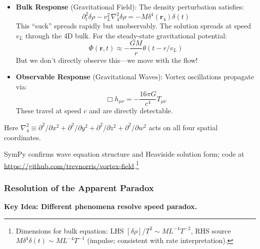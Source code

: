 \begin{itemize}
\item \textbf{Bulk Response} (Gravitational Field): The density perturbation satisfies:
\begin{equation}
\partial_t^2 \delta\rho - v_L^2 \nabla_4^2 \delta\rho = -M\delta^4(\mathbf{r}_4)\delta(t)
\end{equation}
This ``suck'' spreads rapidly but unobservably. The solution spreads at speed $v_L$ through the 4D bulk. For the steady-state gravitational potential:
\begin{equation}
\Phi(\mathbf{r},t) \approx -\frac{GM}{r} \theta(t - r/v_L)
\end{equation}
But we don't directly observe this---we move with the flow!

\item \textbf{Observable Response} (Gravitational Waves): Vortex oscillations propagate via:
\begin{equation}
\Box h_{\mu\nu} = -\frac{16\pi G}{c^4} T_{\mu\nu}
\end{equation}
These travel at speed $c$ and are directly detectable.
\end{itemize}

Here $\nabla_4^2 \equiv \partial^2/\partial x^2 + \partial^2/\partial y^2 + \partial^2/\partial z^2 + \partial^2/\partial w^2$ acts on all four spatial coordinates.



SymPy confirms wave equation structure and Heaviside solution form; code at \url{https://github.com/trevnorris/vortex-field}.\footnote{Dimensions for bulk equation: LHS $[\delta\rho] / T^2 \sim M L^{-4} T^{-2}$, RHS source $M \delta^4 \delta(t) \sim M L^{-4} T^{-1}$ (impulse; consistent with rate interpretation).}

\subsubsection{Resolution of the Apparent Paradox}

\textbf{Key Idea: Different phenomena resolve speed paradox.}

